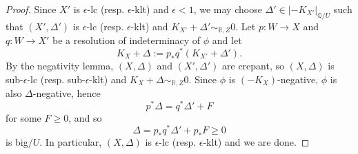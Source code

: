\documentclass[12pt]{amsart}
\numberwithin{equation}{section}
\theoremstyle{definition}
\theoremstyle{definition}
\theoremstyle{definition}
\begin{document}
\begin{proof}
Since $X'$ is $\epsilon$-lc (resp. $\epsilon$-klt) and $\epsilon<1$, we may choose $\Delta'\in |-K_{X'}|_{\mathbb Q/U}$ such that $(X',\Delta')$ is $\epsilon$-lc (resp. $\epsilon$-klt) and $K_{X'}+\Delta'\sim_{\mathbb R,Z}0$. Let $p: W\rightarrow X$ and $q: W\rightarrow X'$ be a resolution of indeterminacy of $\phi$ and let
$$K_X+\Delta:=p_*q^*(K_{X'}+\Delta').$$
By the negativity lemma, $(X,\Delta)$ and $(X',\Delta')$ are crepant, so $(X,\Delta)$ is sub-$\epsilon$-lc (resp. sub-$\epsilon$-klt) and $K_X+\Delta\sim_{\mathbb R,Z}0$. Since $\phi$ is $(-K_X)$-negative, $\phi$ is also $\Delta$-negative, hence
$$p^*\Delta=q^*\Delta'+F$$
for some $F\geq 0$, and so
$$\Delta=p_*q^*\Delta'+p_*F\geq 0$$
is big$/U$. In particular, $(X,\Delta)$ is $\epsilon$-lc (resp. $\epsilon$-klt) and we are done.
\end{proof}
\end{document}
